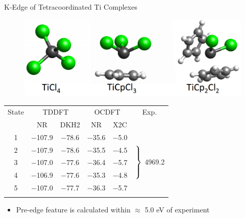 \documentclass[t]{beamer}
\begin{document}
\begin{frame}{K-Edge of Tetracoordinated Ti Complexes}
\begin{figure}
\includegraphics[scale=0.3]{Ti_structs.png}
\end{figure}

\begin{table}[!t]
\footnotesize
\begin{tabular}{cccccc}
\toprule
State & \multicolumn{2}{c}{TDDFT} & \multicolumn{2}{c}{OCDFT} & Exp. \\ \cmidrule(r){2-3}  \cmidrule(l){4-5}
 & NR & DKH2 & NR & X2C  \\
\midrule
1 & $-$107.9& $-$78.6& $-$35.6& $-$5.0 & \multirow{5}{*}{$\left. \vphantom{\begin{tabular}{c}3\\3\\3 \\3\end{tabular}}\right\}$ 4969.2} \\
2 & $-$107.9& $-$78.6& $-$35.5& $-$4.5 \\
3 & $-$107.0& $-$77.6& $-$36.4& $-$5.7 \\
4 & $-$106.9& $-$77.6& $-$35.3& $-$4.8 \\
5 & $-$107.0& $-$77.7& $-$36.3& $-$5.7 \\
\bottomrule
	\label{table:Ti-complex}
\end{tabular}
\end{table}
\begin{itemize}
\item Pre-edge feature is calculated within $\approx$ 5.0 eV of experiment
\end{itemize}
\end{frame}
\end{document}
